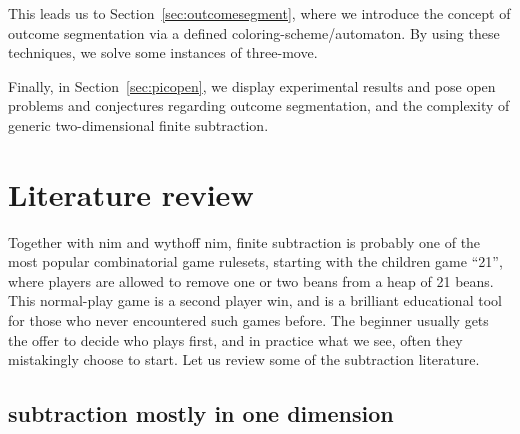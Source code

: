 \documentclass{amsart}
\theoremstyle{plain}
\theoremstyle{definition}
\begin{document}
This leads us to  Section~\ref{sec:outcomesegment}, where we introduce the concept of outcome segmentation via a defined coloring-scheme/automaton.
 By using these techniques, we solve some instances of {\sc three-move}. 

Finally, in Section~\ref{sec:picopen}, we display %
experimental results and pose open problems and conjectures regarding outcome segmentation, and the complexity of generic {\sc two-dimensional finite subtraction}.  
\section{Literature review}\label{sec:literature}
Together with {\sc nim} and {\sc wythoff nim}, {\sc finite subtraction} is probably one of the most popular combinatorial game rulesets, starting with the children game ``21'', where players are allowed to remove one or two beans from a heap of 21 beans. This normal-play game is a second player win, and is a brilliant educational tool for those who never encountered such games before. The beginner usually gets the offer to decide who plays first, and in practice what we see, often they mistakingly choose to start. Let us review some of the {\sc subtraction} literature.


\subsection{{\sc subtraction} mostly in one dimension}\label{sec:1dsubtr}

\end{document}
